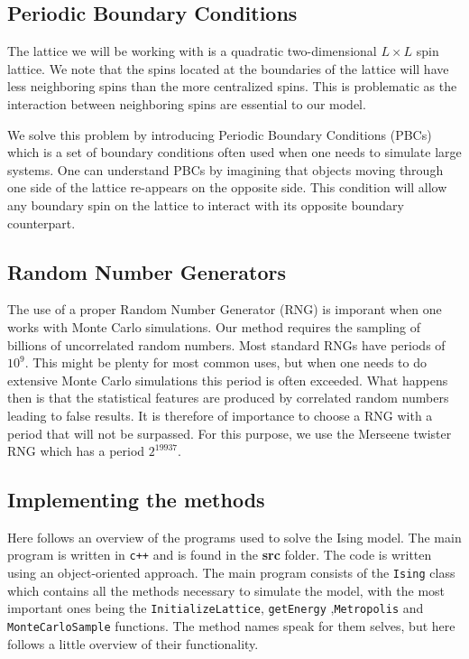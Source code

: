 \documentclass[a4paper, 10pt, reqno]{amsart}
\begin{document}
\subsection{Periodic Boundary Conditions} The lattice we will be working with
is a quadratic two-dimensional $L \times L$ spin lattice. We note that the
spins located at the boundaries of the lattice will have less neighboring
spins than the more centralized spins. This is problematic as the interaction
between neighboring spins are essential to our model.

We solve this problem by introducing Periodic Boundary Conditions (PBCs)
which is a set of boundary conditions often used when one needs to simulate
large systems. One can understand PBCs by imagining that objects moving
through one side of the lattice re-appears on the opposite side. This
condition will allow any boundary spin on the lattice to interact with its
opposite boundary counterpart.

\subsection{Random Number Generators}

The use of a proper Random Number Generator (RNG) is imporant when one works with Monte Carlo simulations. Our method requires the sampling of billions of uncorrelated random numbers. Most standard RNGs have periods of $10^9$. This might be plenty for most common uses, but when one needs to do extensive Monte Carlo simulations this period is often exceeded. What happens then is that the statistical features are produced by correlated random numbers leading to false results. It is therefore of importance to choose a RNG with a period that will not be surpassed. For this purpose, we use the Merseene twister RNG which has a period $2^{19937}$.


\subsection{Implementing the methods}
Here follows an overview of the programs used to solve the Ising model. The main program is written in \texttt{c++} and is found in the \textbf{src} folder. The code is written using an object-oriented approach. The main program consists of the \texttt{Ising} class which contains all the methods necessary to simulate the model, with the most important ones being the \texttt{InitializeLattice}, \texttt{getEnergy} ,\texttt{Metropolis} and \texttt{MonteCarloSample} functions. The method names speak for them selves, but here follows a little overview of their functionality.
\end{document}
